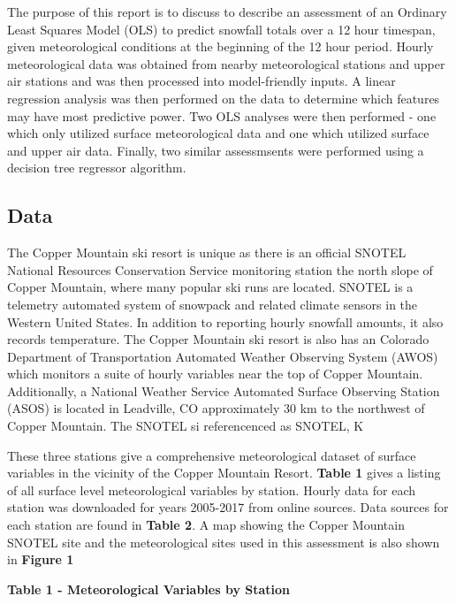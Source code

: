 \documentclass[11pt]{article}
\begin{document}
The purpose of this report is to discuss to describe an assessment of an
Ordinary Least Squares Model (OLS) to predict snowfall totals over a 12
hour timespan, given meteorological conditions at the beginning of the
12 hour period. Hourly meteorological data was obtained from nearby
meteorological stations and upper air stations and was then processed
into model-friendly inputs. A linear regression analysis was then
performed on the data to determine which features may have most
predictive power. Two OLS analyses were then performed - one which only
utilized surface meteorological data and one which utilized surface and
upper air data. Finally, two similar assessmsents were performed using a
decision tree regressor algorithm.

\subsection{Data}\label{data}

The Copper Mountain ski resort is unique as there is an official SNOTEL
National Resources Conservation Service monitoring station the north
slope of Copper Mountain, where many popular ski runs are located.
SNOTEL is a telemetry automated system of snowpack and related climate
sensors in the Western United States. In addition to reporting hourly
snowfall amounts, it also records temperature. The Copper Mountain ski
resort is also has an Colorado Department of Transportation Automated
Weather Observing System (AWOS) which monitors a suite of hourly
variables near the top of Copper Mountain. Additionally, a National
Weather Service Automated Surface Observing Station (ASOS) is located in
Leadville, CO approximately 30 km to the northwest of Copper Mountain.
The SNOTEL si referencenced as SNOTEL, K

These three stations give a comprehensive meteorological dataset of
surface variables in the vicinity of the Copper Mountain Resort.
\textbf{Table 1} gives a listing of all surface level meteorological
variables by station. Hourly data for each station was downloaded for
years 2005-2017 from online sources. Data sources for each station are
found in \textbf{Table 2}. A map showing the Copper Mountain SNOTEL site
and the meteorological sites used in this assessment is also shown in
\textbf{Figure 1}

\textbf{Table 1 - Meteorological Variables by Station}
\end{document}
